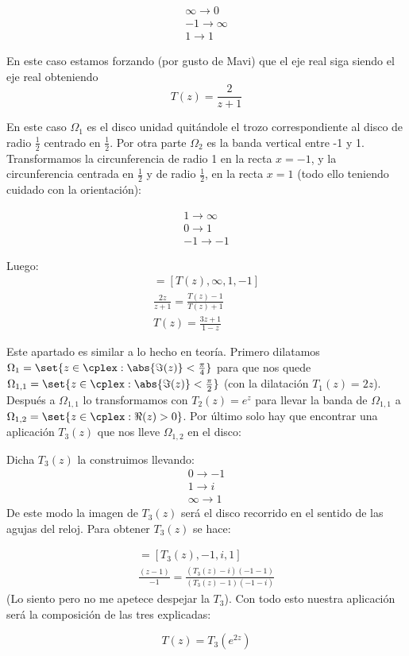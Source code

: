 \begin{problem}[10]
\begin{align*}
	\infty \to 0\\
	-1 \to \infty\\
	1 \to 1
\end{align*}

En este caso estamos forzando (por gusto de Mavi) que el eje real siga siendo el eje real obteniendo
\[T(z)=\frac{2}{z+1}\]



En este caso $\Omega_1$ es el disco unidad quitándole el trozo correspondiente al disco de radio $\frac{1}{2}$ centrado en $\frac{1}{2}$. Por otra parte $\Omega_2$ es la banda vertical entre -1 y 1. Transformamos la circunferencia de radio 1 en la recta $x=-1$, y la circunferencia centrada en $\frac{1}{2}$ y de radio $\frac{1}{2}$, en la recta $x=1$ (todo ello teniendo cuidado con la orientación):

\begin{align*}
	1 \to ∞\\
	0 \to 1\\
	-1 \to -1
\end{align*}

Luego:
\begin{align*}
	[z, 1, 0, -1] = [T(z), ∞, 1, -1]\\
	\frac{2z}{z+1} = \frac{T(z) - 1}{T(z) + 1}\\
	T(z) = \frac{3z+1}{1-z}
\end{align*}




\spart {}

Este apartado es similar a lo hecho en teoría. Primero dilatamos $\Omega_{1} = \set{z \in \cplex: \abs{\Im(z)} < \frac{\pi}{4}}$ para que nos quede $\Omega_{1,1} = \set{z \in \cplex: \abs{\Im(z)} < \frac{\pi}{2}}$ (con la dilatación $T_1(z)=2z$). Después a $\Omega_{1,1}$ lo transformamos con $T_2(z) = e^z$ para llevar la banda de $\Omega_{1,1}$ a  $\Omega_{1,2} = \set{z \in \cplex: \Re(z) > 0}$. Por último solo hay que encontrar una aplicación $T_3(z)$ que nos lleve $\Omega_{1,2}$ en el disco:

Dicha $T_3(z)$ la construimos llevando:
\begin{align*}
	0 \to -1\\
	1 \to i\\
	∞ \to 1
\end{align*}
De este modo la imagen de $T_3(z)$ será el disco recorrido en el sentido de las agujas del reloj. Para obtener $T_3(z)$ se hace:

\begin{align*}
	[z, 0, 1, ∞] = [T_3(z), -1, i, 1]\\
	\frac{(z - 1)}{-1} = \frac{(T_3(z) - i)(-1-1)}{(T_3(z) - 1)(-1-i)}
\end{align*}
(Lo siento pero no me apetece despejar la $T_3$). Con todo esto nuestra aplicación será la composición de las tres explicadas:

\[T(z) = T_3(e^{2z})\]

\spart

\end{problem}

